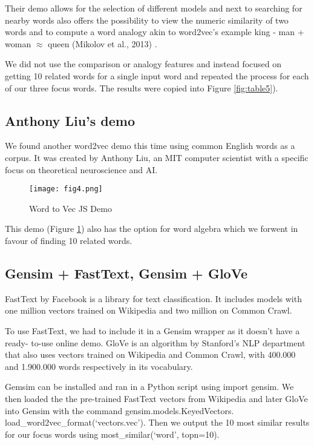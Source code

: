 \documentclass[12pt, usenames, dvipsnames]{report}
\begin{document}
\begin{flushleft}
Their demo allows for the selection of different models and next to searching
for nearby words also offers the possibility to view the numeric similarity of two words and to compute a word analogy akin to word2vec's example king - man + woman $\approx$ queen (Mikolov et al., 2013) \cite{mikolov2013}.

We did not use the comparison or analogy features and instead focused on getting 10 related words for a single input word and repeated the process for each of our three focus words.
The results were copied into Figure \ref{fig:table5}).

\subsection{Anthony Liu’s demo}

We found another word2vec demo this time using common English words as a corpus.
It was created by Anthony Liu, an MIT computer scientist with a specific focus on theoretical neuroscience and AI.

\vspace*{1.2em}
\begin{figure}[!htbp]
  \hspace*{-3.666em}
  \texttt{[image: fig4.png]}
  \caption{Word to Vec JS Demo}
  \label{fig:figure4}
\end{figure}
\vspace*{1.2em}

This demo (Figure \ref{fig:figure4}) also has the option for word algebra which we forwent in favour of finding 10 related words.

\subsection{Gensim + FastText, Gensim + GloVe}

FastText by Facebook is a library for text classification.
It includes models with one million vectors trained on Wikipedia and two million on Common Crawl.

To use FastText, we had to include it in a Gensim wrapper as it doesn’t have a ready- to-use online demo.
GloVe is an algorithm by Stanford’s NLP department that also uses vectors trained on Wikipedia and Common Crawl, with 400.000 and 1.900.000 words respectively in its vocabulary.

Gemsim can be installed and ran in a Python script using import gensim.
We then loaded the the pre-trained FastText vectors from Wikipedia and later GloVe into Gensim with the command gensim.models.KeyedVectors. load\_word2vec\_format(‘vectors.vec’).
Then we output the 10 most similar results for our focus words using most\_similar(‘word’, topn=10).


\end{flushleft}
\end{document}
